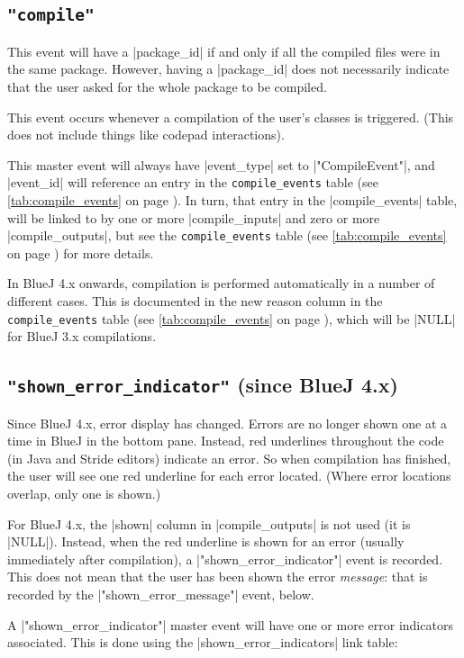 \documentclass{report}
\newcommand{\myref}[1]{\autoref{#1} on page \pageref*{#1}}
\newcommand{\tabref}[1]{\lstinline|#1| table (see \myref{tab:#1})}
\begin{document}
\subsection{\lstinline!"compile"!}

This event will have a |package_id| if and only if all the compiled files were
in the same package.  However, having a |package_id| does not necessarily
indicate that the user asked for the whole package to be compiled.

This event occurs whenever a compilation of the user's classes is triggered.
(This does not include things like codepad interactions).

This master event will always have |event_type| set to |"CompileEvent"|, and
|event_id| will reference an entry in the \tabref{compile_events}.  In turn,
that entry in the |compile_events| table, will be linked to by one or more
|compile_inputs| and zero or more |compile_outputs|, but see the
\tabref{compile_events} for more details.

In BlueJ 4.x onwards, compilation is performed
automatically in a number of different cases.  This is documented in the new
reason column in the \tabref{compile_events}, which will be |NULL| for BlueJ 3.x compilations.

\subsection{\lstinline!"shown_error_indicator"! (since BlueJ 4.x)}

Since BlueJ 4.x, error display has changed.  Errors
are no longer shown one at a time in BlueJ in the bottom pane.  Instead, red underlines
throughout the code (in Java and Stride editors) indicate an error.  So when compilation
has finished, the user will see one red underline for each error located.  (Where error locations
overlap, only one is shown.)

For BlueJ 4.x, the |shown| column in |compile_outputs| is not used (it is |NULL|).  Instead, when the red underline is shown for an error (usually immediately after compilation), a |"shown_error_indicator"| event is recorded.  This does not mean that the user has been shown
the error \textit{message}: that is recorded by the |"shown_error_message"| event, below.

A |"shown_error_indicator"| master event will have one or more error indicators associated.
This is done using the |shown_error_indicators| link table:

\end{document}
